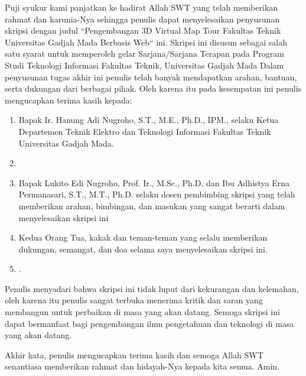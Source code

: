 \begin{center}
\end{center}

Puji syukur kami panjatkan ke hadirat Allah SWT yang telah memberikan rahmat dan karunia-Nya sehingga penulis dapat menyelesaikan penyusunan skripsi dengan judul “Pengembangan 3D Virtual Map Tour Fakultas Teknik Universitas Gadjah Mada Berbasis Web“ ini. Skripsi ini disusun sebagai salah satu syarat untuk memperoleh gelar Sarjana/Sarjana Terapan pada Program Studi Teknologi Informasi Fakultas Teknik, Universitas Gadjah Mada Dalam penyusunan tugas akhir ini penulis telah banyak mendapatkan arahan, bantuan, serta dukungan dari berbagai pihak. Oleh karena itu pada kesempatan ini penulis mengucapkan terima kasih kepada:

\begin{enumerate}
	\item Bapak Ir. Hanung Adi Nugroho, S.T., M.E., Ph.D., IPM., selaku Ketua Departemen Teknik Elektro dan Teknologi Informasi Fakultas Teknik Universitas Gadjah Mada.
	
	\item <isi dengan nama Sekdep>
	
	\item Bapak Lukito Edi Nugroho, Prof. Ir., M.Sc., Ph.D. dan Ibu Adhistya Erna Permanasari, S.T., M.T., Ph.D. selaku dosen pembimbing skripsi yang telah memberikan arahan, bimbingan, dan masukan yang sangat berarti dalam menyelesaikan skripsi ini
	
	\item Kedua Orang Tua, kakak dan teman-teman yang selalu memberikan dukungan, semangat, dan doa selama saya menyelesaikan skripsi ini.
	
	\item <isi dengan nama orang lainnya>.

\end{enumerate}

Penulis menyadari bahwa skripsi ini tidak luput dari kekurangan dan kelemahan, oleh karena itu penulis sangat terbuka menerima kritik dan saran yang membangun untuk perbaikan di masa yang akan datang. Semoga skripsi ini dapat bermanfaat bagi pengembangan ilmu pengetahuan dan teknologi di masa yang akan datang.

Akhir kata, penulis mengucapkan terima kasih dan semoga Allah SWT senantiasa memberikan rahmat dan hidayah-Nya kepada kita semua. Amin.


